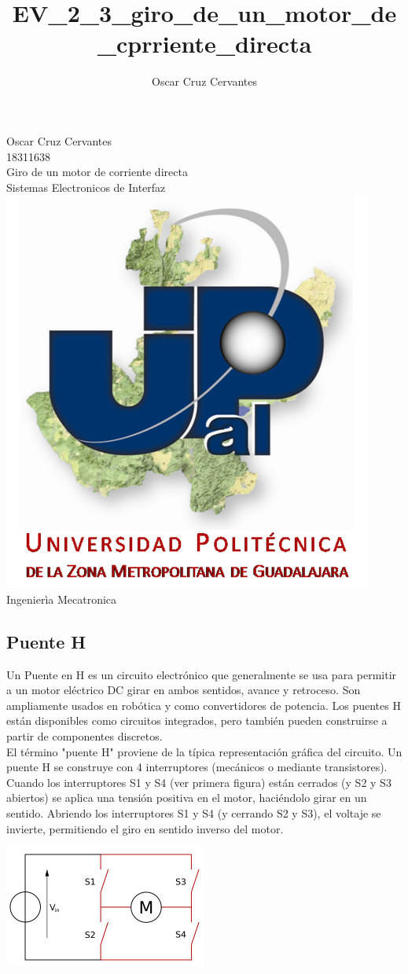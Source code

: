 \documentclass[12pt,a4paper]{report}
\author{Oscar Cruz Cervantes}
\title{EV_2_3_giro_de_un_motor_de_cprriente_directa}
\begin{document}
\begin{center}
Oscar Cruz Cervantes\\
18311638\\
Giro de un motor de corriente directa\\
Sistemas Electronicos de Interfaz\\
\includegraphics[scale=1.5]{01.png}\\
Ingenierìa Mecatronica\\
\end{center}
\newpage
\subsection{Puente H}

Un Puente en H es un circuito electrónico que generalmente se usa para permitir a un motor eléctrico DC girar en ambos sentidos, avance y retroceso. Son ampliamente usados en robótica y como convertidores de potencia. Los puentes H están disponibles como circuitos integrados, pero también pueden construirse a partir de componentes discretos.\\
El término "puente H" proviene de la típica representación gráfica del circuito. Un puente H se construye con 4 interruptores (mecánicos o mediante transistores). Cuando los interruptores S1 y S4 (ver primera figura) están cerrados (y S2 y S3 abiertos) se aplica una tensión positiva en el motor, haciéndolo girar en un sentido. Abriendo los interruptores S1 y S4 (y cerrando S2 y S3), el voltaje se invierte, permitiendo el giro en sentido inverso del motor.
\begin{center}
\includegraphics[scale=1.5]{02.png}
\end{center}
\end{document}
